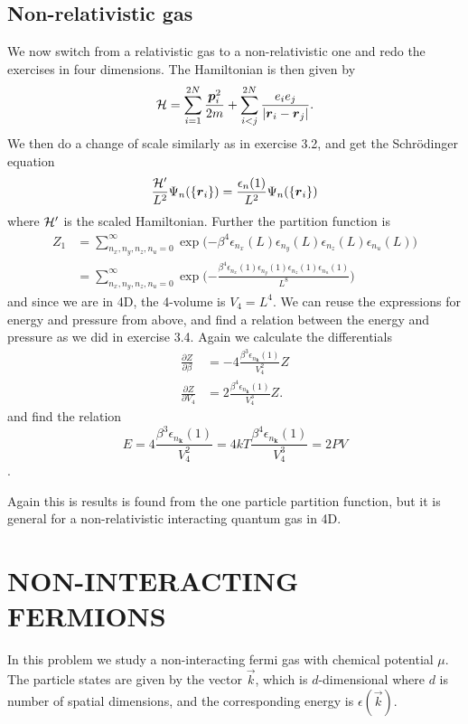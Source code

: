 \documentclass[norsk,a4paper,12pt]{article}
\begin{document}
\subsection{Non-relativistic gas}
We now switch from a relativistic gas to a non-relativistic one and redo the exercises in four dimensions. The Hamiltonian is then given by
\begin{equation}
{\cal H}=\sum_{i=1}^{2N}\frac{\boldsymbol{p}_i^2}{2m}+\sum_{i<j}^{2N}\frac{e_ie_j}{|\boldsymbol{r}_i - \boldsymbol{r}_j|}.
\end{equation}
We then do a change of scale similarly as in exercise 3.2, and get the Schrödinger equation 
\begin{equation}
\frac{{\cal H}'}{L^2}\Psi_n(\{\boldsymbol{r}_i\})=\frac{\epsilon_n(1)}{L^2}\Psi_n(\{\boldsymbol{r}_i\})
\end{equation}
where  ${\cal H}'$ is the scaled Hamiltonian. Further the partition function is 
\begin{align}
Z_1&=\sum_{n_x,n_y,n_z,n_u=0}^{\infty}\exp\Big({-\beta^4\epsilon_{n_x}(L)\epsilon_{n_y}(L)\epsilon_{n_z}(L)\epsilon_{n_u}(L)}\Big)\\
&=\sum_{n_x,n_y,n_z,n_u=0}^{\infty}\exp\Big({-\frac{\beta^4\epsilon_{n_x}(1)\epsilon_{n_y}(1)\epsilon_{n_z}(1)\epsilon_{n_u}(1)}{L^8}}\Big)
\end{align}
and since we are in 4D, the 4-volume is $V_4=L^4$. We can reuse the expressions for energy and pressure from above, and find a relation between the energy and pressure as we did in exercise 3.4. Again we calculate the differentials
\begin{align}
\frac{\partial Z}{\partial \beta}&=-4\frac{\beta^3\epsilon_{n_{\boldsymbol{k}}}(1)}{V_4^2}Z\\
\frac{\partial Z}{\partial V_4}&=2\frac{\beta^4\epsilon_{n_{\boldsymbol{k}}}(1)}{V_4^3}Z.
\end{align}
and find the relation
\begin{equation}
E=4\frac{\beta^3\epsilon_{n_{\boldsymbol{k}}}(1)}{V_4^2}=4kT\frac{\beta^4\epsilon_{n_{\boldsymbol{k}}}(1)}{V_4^3}=2PV
\end{equation}.

Again this is results is found from the one particle partition function, but it is general for a non-relativistic interacting quantum gas in 4D.

\newpage
\section{NON-INTERACTING FERMIONS}
In this problem we study a non-interacting fermi gas with chemical potential $\mu$. The particle states are given by the vector $\vec{k}$, which is $d$-dimensional where $d$ is number of spatial dimensions, and the corresponding energy is $\epsilon(\vec{k})$.
\end{document}
